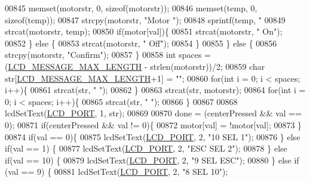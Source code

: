\begin{DoxyCode}
{{{{{{{{{{{{00845             memset(motorstr, 0, \textcolor{keyword}{sizeof}(motorstr));
00846             memset(temp, 0, \textcolor{keyword}{sizeof}(temp));
00847             strcpy(motorstr, \textcolor{stringliteral}{"Motor "});
00848             sprintf(temp, \textcolor{stringliteral}{"%
00849             strcat(motorstr, temp);
00850             \textcolor{keywordflow}{if}(motor[val])\{
00851                 strcat(motorstr, \textcolor{stringliteral}{" On"});
00852             \} \textcolor{keywordflow}{else} \{
00853                 strcat(motorstr, \textcolor{stringliteral}{" Off"});
00854             \}
00855         \} \textcolor{keywordflow}{else} \{
00856             strcpy(motorstr, \textcolor{stringliteral}{"Confirm"});
00857         \}
00858         \textcolor{keywordtype}{int} spaces = (\hyperlink{lcdmsg_8h_abe4c4b70fc6f44ae3680e5b2c68cdd00}{LCD\_MESSAGE\_MAX\_LENGTH} - strlen(motorstr))/2;
00859         \textcolor{keywordtype}{char} str[\hyperlink{lcdmsg_8h_abe4c4b70fc6f44ae3680e5b2c68cdd00}{LCD\_MESSAGE\_MAX\_LENGTH}+1] = \textcolor{stringliteral}{""};
00860         \textcolor{keywordflow}{for}(\textcolor{keywordtype}{int} i = 0; i < spaces; i++)\{
00861             strcat(str, \textcolor{stringliteral}{" "});
00862         \}
00863         strcat(str, motorstr);
00864         \textcolor{keywordflow}{for}(\textcolor{keywordtype}{int} i = 0; i < spaces; i++)\{
00865             strcat(str, \textcolor{stringliteral}{" "});
00866         \}
00867 
00868         lcdSetText(\hyperlink{lcdmsg_8h_abcf42bd88b3c36193f301ca25b033875}{LCD\_PORT}, 1, str);
00869 
00870         done = (centerPressed && val == 0);
00871         \textcolor{keywordflow}{if}(centerPressed && val != 0)\{
00872             motor[val] = !motor[val];
00873         \}
00874         \textcolor{keywordflow}{if}(val == 0)\{
00875             lcdSetText(\hyperlink{lcdmsg_8h_abcf42bd88b3c36193f301ca25b033875}{LCD\_PORT}, 2, \textcolor{stringliteral}{"10     SEL     1"});
00876         \} \textcolor{keywordflow}{else} \textcolor{keywordflow}{if}(val == 1) \{
00877             lcdSetText(\hyperlink{lcdmsg_8h_abcf42bd88b3c36193f301ca25b033875}{LCD\_PORT}, 2, \textcolor{stringliteral}{"ESC    SEL     2"});
00878         \} \textcolor{keywordflow}{else} \textcolor{keywordflow}{if}(val == 10) \{
00879             lcdSetText(\hyperlink{lcdmsg_8h_abcf42bd88b3c36193f301ca25b033875}{LCD\_PORT}, 2, \textcolor{stringliteral}{"9      SEL   ESC"});
00880         \} \textcolor{keywordflow}{else} \textcolor{keywordflow}{if} (val == 9) \{
00881             lcdSetText(\hyperlink{lcdmsg_8h_abcf42bd88b3c36193f301ca25b033875}{LCD\_PORT}, 2, \textcolor{stringliteral}{"8      SEL    10"});
}}}}}}}}}}}}}
\end{DoxyCode}
